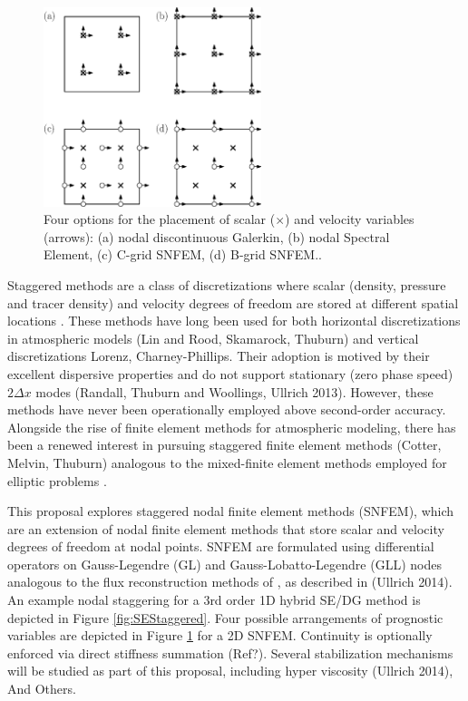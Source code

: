 \documentclass[11pt]{article}
\begin{document}
\begin{figure}
\begin{center}
\includegraphics[width=2.5in]{NodalArrangement}
\end{center}
\caption{Four options for the placement of scalar ($\times$) and velocity variables (arrows): (a) nodal discontinuous Galerkin, (b) nodal Spectral Element, (c) C-grid SNFEM, (d) B-grid SNFEM..} \label{fig:NodalArrangement}
\end{figure}

Staggered methods are a class of discretizations where scalar (density, pressure and tracer density) and velocity degrees of freedom are stored at different spatial locations \cite{AAVRL1977GCM}.  These methods have long been used for both horizontal discretizations in atmospheric models \citep{SJL2004MWR, WMPSJL2009NMSPF, SWCKJBDJetal2001, WCSJBKMGDLDFSHPTDR2012MWR} {\color{red}(Lin and Rood, Skamarock, Thuburn)} and vertical discretizations \cite{AASM1988JAS, JGCNAP1953JAS} {\color{red}Lorenz, Charney-Phillips}.  Their adoption is motived by their excellent dispersive properties and do not support stationary (zero phase speed) $2 \Delta x$ modes \cite{DAR1994MWR, JTTJW2005JCP} {\color{red}(Randall, Thuburn and Woollings, Ullrich 2013)}.  However, these methods have never been operationally employed above second-order accuracy.  Alongside the rise of finite element methods for atmospheric modeling, there has been a renewed interest in pursuing staggered finite element methods \citep{DBLG2009CS, CJCJS2012JCP} {\color{red}(Cotter, Melvin, Thuburn)} analogous to the mixed-finite element methods employed for elliptic problems \cite{PRJT1977MAFEM}.

This proposal explores staggered nodal finite element methods (SNFEM), which are an extension of nodal finite element methods that store scalar and velocity degrees of freedom at nodal points.  SNFEM are formulated using differential operators on Gauss-Legendre (GL) and Gauss-Lobatto-Legendre (GLL) nodes analogous to the flux reconstruction methods of \cite{HTH2007AIAA}, as described in {\color{red}(Ullrich 2014)}.  An example nodal staggering for a 3rd order 1D hybrid SE/DG method is depicted in Figure \ref{fig:SEStaggered}.  Four possible arrangements of prognostic variables are depicted in Figure \ref{fig:NodalArrangement} for a 2D SNFEM.  Continuity is optionally enforced via direct stiffness summation {\color{red}(Ref?)}.  Several stabilization mechanisms will be studied as part of this proposal, including hyper viscosity \citep{OGMNLJROMATPAU2013} {\color{red}(Ullrich 2014)}, {\color{blue} And Others}.
\end{document}
